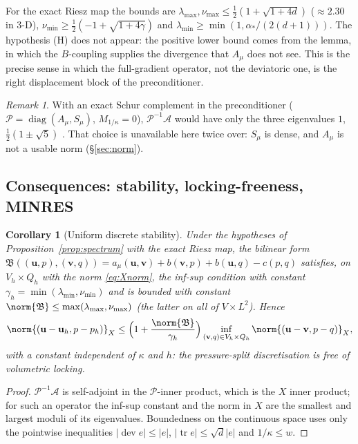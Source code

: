\documentclass[11pt]{article}
\numberwithin{equation}{section}
\newtheorem{corollary}[proposition]{Corollary}
\theoremstyle{remark}
\newtheorem{remark}[proposition]{Remark}
\newcommand{\tr}{\operatorname{tr}}
\newcommand{\dev}{\operatorname{dev}}
\newcommand{\vu}{\mathbf{u}}
\newcommand{\vv}{\mathbf{v}}
\newcommand{\Amu}{A_{\mu}}
\newcommand{\Mk}{M_{1/\kappa}}
\newcommand{\Vh}{V_h}
\newcommand{\Qh}{Q_h}
\begin{document}
For the exact Riesz map the bounds are $\lambda_{\max},\nu_{\max}\le
\frac12(1 + \sqrt{1 + 4d})$ ($\approx2.30$ in 3-D), $\nu_{\min}\ge
\frac12(-1 + \sqrt{1 + 4\gamma})$ and $\lambda_{\min}\ge\min(1,
\alpha_*/(2(d+1)))$. The hypothesis (H) does not appear: the
positive lower bound comes from the lemma, in which the $B$-coupling
supplies the divergence that $\Amu$ does not see. This is the precise sense
in which the full-gradient operator, not the deviatoric one, is the right
displacement block of the preconditioner.

\begin{remark}
With an exact Schur complement in the preconditioner ($\mathcal P =
\operatorname{diag}(\Amu,S_\mu)$, $\Mk = 0$), $\mathcal P^{-1}\mathcal A$
would have only the three eigenvalues $1$, $\frac12(1\pm\sqrt5)$
\cite{MurphyGolubWathen2000}. That choice is unavailable here twice over:
$S_\mu$ is dense, and $\Amu$ is not a usable norm (\S\ref{sec:norm}).
\end{remark}

\subsection{Consequences: stability, locking-freeness, MINRES}

\begin{corollary}[Uniform discrete stability]
\label{cor:stability}
Under the hypotheses of Proposition~\ref{prop:spectrum} with the exact
Riesz map, the bilinear form $\mathfrak B((\vu,p),(\vv,q)) = a_\mu(\vu,\vv) +
b(\vv,p) + b(\vu,q) - c(p,q)$ satisfies, on $\Vh\times\Qh$ with the norm
\eqref{eq:Xnorm}, the inf-sup condition with constant $\gamma_h =
\min(\lambda_{\min},\nu_{\min})$ and is bounded with constant
$\norm{\mathfrak B}\le\max(\lambda_{\max},\nu_{\max})$ (the latter on all
of $V\times L^2$). Hence \cite{Babuska1971}
\begin{equation}
  \norm{(\vu - \vu_h, p - p_h)}_X\le
  \Bigl(1 + \frac{\norm{\mathfrak B}}{\gamma_h}\Bigr)
  \inf_{(\vv,q)\in\Vh\times\Qh}\norm{(\vu - \vv, p - q)}_X ,
\end{equation}
with a constant independent of $\kappa$ and $h$: the pressure-split
discretisation is free of volumetric locking.
\end{corollary}
\begin{proof}
$\mathcal P^{-1}\mathcal A$ is self-adjoint in the $\mathcal P$-inner
product, which is the $X$ inner product; for such an operator the inf-sup
constant and the norm in $X$ are the smallest and largest moduli of its
eigenvalues. Boundedness on the continuous space uses only the pointwise
inequalities $|\dev e|\le|e|$, $|\tr e|\le\sqrt d|e|$ and $1/\kappa\le w$.
\end{proof}
\end{document}
